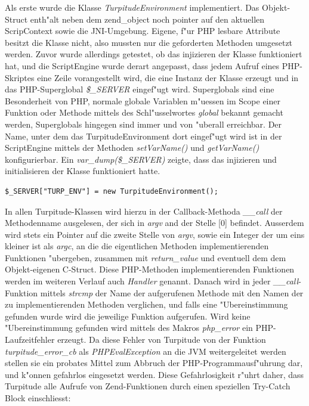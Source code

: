 Als erste wurde die Klasse \emph{TurpitudeEnvironment} implementiert. Das Objekt-Struct enth"alt neben dem zend\_object noch pointer
auf den aktuellen ScripContext sowie die JNI-Umgebung. Eigene, f"ur PHP lesbare Attribute besitzt die Klasse nicht, also mussten
nur die geforderten Methoden umgesetzt werden. Zuvor wurde allerdings getestet, ob das injizieren der Klasse funktioniert hat, und die
ScriptEngine wurde derart angepasst, dass jedem Aufruf eines PHP-Skriptes eine Zeile vorangestellt wird, die eine Instanz der Klasse
erzeugt und in das PHP-Superglobal \emph{\$\_SERVER} eingef"ugt wird. Superglobals sind eine Besonderheit von PHP, normale globale
Variablen m"uessen im Scope einer Funktion oder Methode mittels des Schl"usselwortes \emph{global} bekannt gemacht werden, Superglobals
hingegen sind immer und von "uberall erreichbar. Der Name, unter dem das TurpitudeEnvironment dort eingef"ugt wird ist in der ScriptEngine
mittels der Methoden \emph{setVarName()} und \emph{getVarName()} konfigurierbar. Ein \emph{var\_dump(\$\_SERVER)} zeigte, dass das
injizieren und initialisieren der Klasse funktioniert hatte.
\begin{lstlisting}[caption=TurpitudeEnvironment in \$\_SERVER einf"ugen]
$_SERVER["TURP_ENV"] = new TurpitudeEnvironment();
\end{lstlisting}
In allen Turpitude-Klassen wird hierzu in der Callback-Methoda \emph{\_\_call} der 
Methodenname ausgelesen, der sich in \emph{argv} and der Stelle [0] befindet. Ausserdem wird stets ein Pointer auf die zweite Stelle
von \emph{argv}, sowie ein Integer der um eins kleiner ist als \emph{argc}, an die die eigentlichen
Methoden implementierenden Funktionen "ubergeben, zusammen mit \emph{return\_value} und eventuell dem dem Objekt-eigenen C-Struct.
Diese PHP-Methoden implementierenden Funktionen werden im weiteren Verlauf auch \emph{Handler} genannt.
Danach wird in jeder \emph{\_\_call}-Funktion mittels \emph{strcmp} der Name der aufgerufenen Methode mit den Namen der zu implementierenden 
Methoden verglichen, und falls eine "Ubereinstimmung gefunden wurde wird die jeweilige Funktion aufgerufen. Wird keine "Ubereinstimmung
gefunden wird mittels des Makros \emph{php\_error} ein PHP-Laufzeitfehler erzeugt. Da diese Fehler von Turpitude von der Funktion
\emph{turpitude\_error\_cb} als \emph{PHPEvalException} an die JVM weitergeleitet werden stellen sie ein probates Mittel zum Abbruch
der PHP-Programmausf"uhrung dar, und k"onnen gefahrlos eingesetzt werden. 
Diese Gefahrlosigkeit r"uhrt daher, dass Turpitude alle Aufrufe von Zend-Funktionen durch einen speziellen Try-Catch Block einschliesst:
